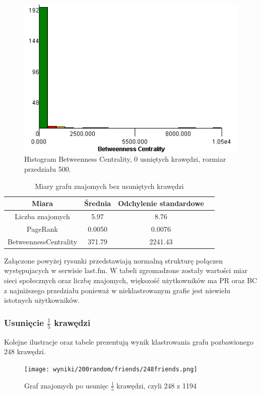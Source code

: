 \documentclass[10pt,a4paper,epic,carom]{article}
\begin{document}
\begin{figure}[H]
\centering
\caption{Histogram Betweenness Centrality, 0 usniętych krawędzi, rozmiar przedziału 500.}
\includegraphics[scale=0.6]{200friendsBC0.png}
\end{figure}


\begin{table}[H]
  \caption{Miary grafu znajomych bez usuniętych krawędzi}
  \centering
    \begin{tabular}{cccc}
    \addlinespace
    \toprule
    Miara & Średnia  & Odchylenie standardowe \\
    \midrule
    Liczba znajomych & 5.97 & 8.76 \\
    PageRank & 0.0050 & 0.0076 \\
    BetweennessCentrality & 371.79 & 2241.43\\ 
    \bottomrule
    \end{tabular}
  \label{tab:addlabel}
\end{table}

Załączone powyżej rysunki przedstawiają normalną strukturę połączen występujacych w serwisie last.fm. W tabeli zgromadzone zostały wartości miar sieci społecznych oraz liczbę znajomych, większość użytkowników ma PR oraz BC z najniższego przedziału ponieważ w nieklastrowanym grafie jest niewielu istotnych użytkowników.

\subsubsection {Usunięcie $\frac{1}{5}$ krawędzi}
Kolejne ilustracje oraz tabele prezentują wynik klastrowania grafu pozbawionego 248 krawędzi.
\begin{figure}[H]
\centering
\caption{Graf znajomych po usunięc $ \frac{1}{5}$ krawędzi,  czyli 248 z 1194}
\texttt{[image: wyniki/200random/friends/248friends.png]}
\end{figure}
\end{document}
